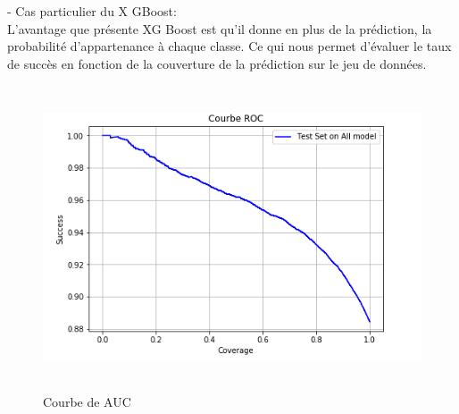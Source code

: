 - Cas particulier du X GBoost:\\
L’avantage que présente XG Boost est qu’il donne en plus de la prédiction, la probabilité d’appartenance à chaque classe. Ce qui nous permet d’évaluer le taux de succès en fonction de la couverture de la prédiction sur le jeu de données.
\begin{figure}[h]
\begin{center}
\includegraphics[width=15cm,height=9cm]{images/roc_auc.png}
\caption[Courbe de AUC]{Courbe de AUC}
\label{monlabel}
\end{center}
\end{figure}
\newpage

